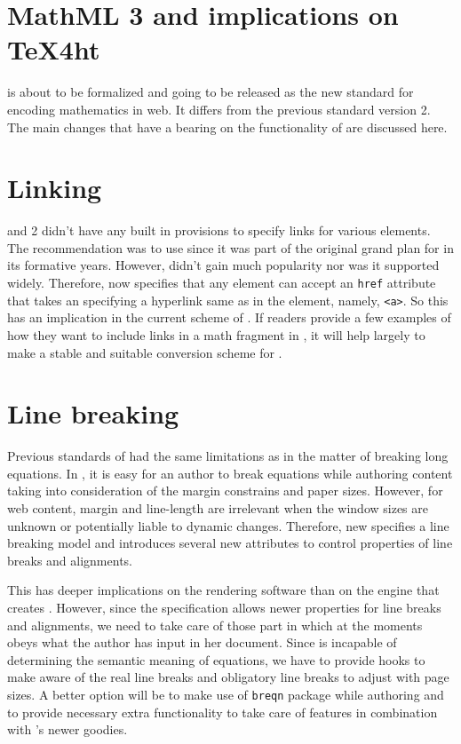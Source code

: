 \documentclass[a4paper]{article}
\begin{document}
\section{MathML 3 and implications on TeX4ht}

\leavevmode
{} is about to be formalized and going to be released as the new standard for encoding mathematics in web. It differs from the previous standard version 2. The main changes that have a bearing on the functionality of  are discussed here.

\section{Linking}

 and 2 didn't have any built in provisions to specify links for various elements. The recommendation was to use  since it was part of the original grand plan for  in its formative years. However, \xlink didn't gain much popularity nor was it supported widely. Therefore,  now specifies that any \mathml element can accept an \verb+href+ attribute that takes an \uri specifying a hyperlink same as in the  element, namely, \verb+<a>+. So this has an implication in the current scheme of \texht. If readers provide a few examples of how they want to include links in a math fragment in \latex, it will help largely to make a stable and suitable conversion scheme for \texht.

\section{Line breaking}

Previous standards of \mathml had the same limitations as \tex in the matter of breaking long equations. In \tex, it is easy for an author to break equations while authoring content taking into consideration of the margin constrains and paper sizes. However, for web content, margin and line-length are irrelevant when the window sizes are unknown or potentially liable to dynamic changes. Therefore, new  specifies a line breaking model and introduces several new attributes to control properties of line breaks and alignments. 

This has deeper implications on the rendering software than on the engine that creates \mathml.  However, since the specification allows newer properties for line breaks and alignments, we need to take care of those part in \texht which at the moments obeys what the author has input in her \latex document.  Since \tex is incapable of determining the semantic meaning of equations, we have to provide hooks to make \texht aware of the real line breaks and obligatory line breaks to adjust with page sizes.  A better option will be to make use of \verb+breqn+ package while authoring and \texht to provide necessary extra functionality to take care of  features in combination with \mathml's newer goodies.
\end{document}
